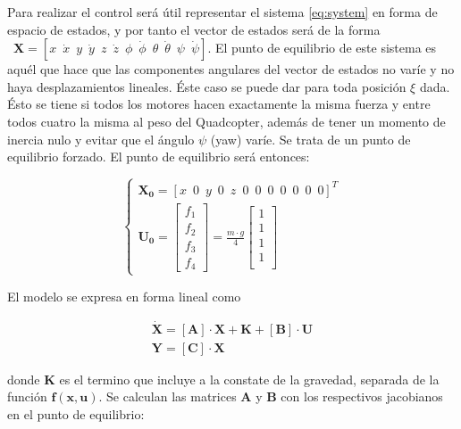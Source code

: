 \documentclass[twoside]{article}
\begin{document}
Para realizar el control será útil representar el sistema \ref{eq:system} en forma de espacio de estados, y por tanto el vector de estados será de la forma $\enspace \pmb{X}=\left[ x \enspace \dot{x} \enspace y \enspace \dot{y} \enspace z \enspace \dot{z} \enspace \phi \enspace \dot{\phi} \enspace \theta \enspace \dot{\theta} \enspace \psi \enspace \dot{\psi} \right]$. El punto de equilibrio de este sistema es aquél que hace que las componentes angulares del vector de estados no varíe y no haya desplazamientos lineales. Éste caso se puede dar para toda posición $\xi$ dada. Ésto se tiene si todos los motores hacen exactamente la misma fuerza y entre todos cuatro la misma al peso del Quadcopter, además de tener un momento de inercia nulo y evitar que el ángulo  $\psi$ (yaw) varíe. Se trata de un punto de equilibrio forzado. El punto de equilibrio será entonces:

\begin{equation}
\begin{cases}
\pmb{X_0}=\left[x \enspace 0 \enspace y \enspace 0 \enspace z \enspace 0 \enspace 0 \enspace 0 \enspace 0 \enspace 0 \enspace 0 \enspace 0 \right]^{T} \\
\pmb{U_0}=\left[ \begin{array}{l}
f_{1} \\
f_{2} \\
f_{3} \\
f_{4} \end{array} \right] = \frac{m \cdot g}{4} \left[ \begin{array}{l}
1 \\
1 \\
1 \\
1 \\ \end{array} \right]
\end{cases}
\end{equation}

El modelo se expresa en forma lineal como

\begin{equation}
\begin{array}{l}
\pmb{\dot{X}}=[\pmb{A}] \cdot \pmb{X} + \pmb{K} + [\pmb{B}] \cdot \pmb{U} \\
\pmb{Y} = [\pmb{C}] \cdot \pmb{X} 
\end{array}
\end{equation} 

donde $\pmb{K}$ es el termino que incluye a la constate de la gravedad, separada de la función $\pmb{f(x,u)}$. Se calculan las matrices $\pmb{A}$ y $\pmb{B}$ con los respectivos jacobianos en el punto de equilibrio:
\end{document}
